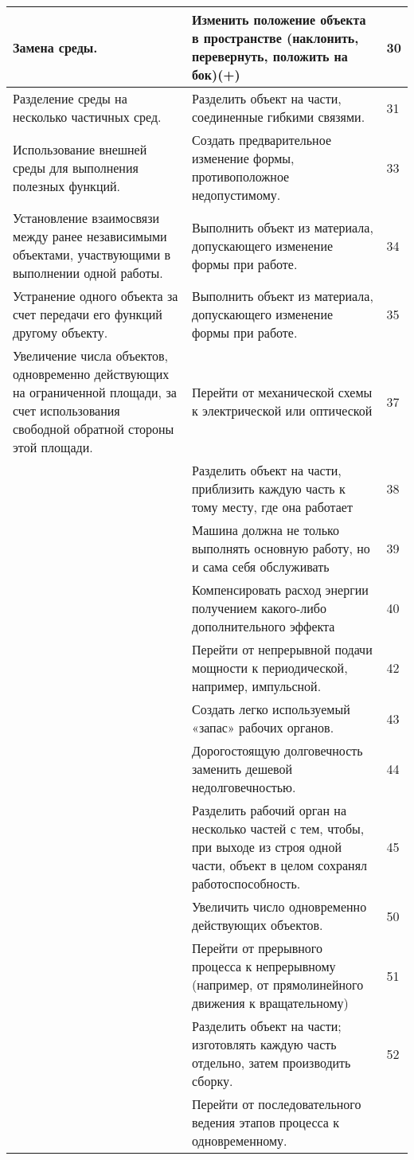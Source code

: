 \documentclass[11pt,a4paper]{article}
\begin{document}
\begin{center}
\begin{tabular}{|p{}|p{}|p{}|}
Замена среды. & Изменить положение объекта в пространстве (наклонить,
перевернуть, положить на бок)(+) & 30\\\hline
Разделение среды на несколько частичных сред. & Разделить объект на части,
соединенные гибкими связями. & 31\\\hline
Использование внешней среды для выполнения полезных функций. & Создать
предварительное изменение формы, противоположное недопустимому. & 33\\\hline
Установление взаимосвязи между ранее независимыми объектами, участвующими в
выполнении одной работы. & Выполнить объект из материала, допускающего
изменение формы при работе. & 34\\\hline
Устранение одного объекта за счет передачи его функций другому объекту. &
Выполнить объект из материала, допускающего изменение формы при работе. &
35\\\hline
Увеличение числа объектов, одновременно действующих на ограниченной площади,
за счет использования свободной обратной стороны этой площади. & Перейти от
механической схемы к электрической или оптической & 37\\\hline
&Разделить объект на части, приблизить каждую часть к тому месту, где она
работает &38\\\hline
&Машина должна не только выполнять основную работу, но и сама себя
обслуживать &39\\\hline
&Компенсировать расход энергии получением какого-либо дополнительного эффекта
&40\\\hline
&Перейти от непрерывной подачи мощности к периодической, например, импульсной.
&42\\\hline
&Создать легко используемый «запас» рабочих органов. & 43\\\hline
&Дорогостоящую долговечность заменить дешевой недолговечностью. & 44\\\hline
&Разделить рабочий орган на несколько частей с тем, чтобы, при выходе из строя
одной части, объект в целом сохранял работоспособность.  & 45\\\hline
&Увеличить число одновременно действующих объектов.  & 50\\\hline
&Перейти от прерывного процесса к непрерывному (например, от прямолинейного
движения к вращательному) & 51\\\hline
&Разделить объект на части; изготовлять каждую часть отдельно, затем
производить сборку. & 52\\\hline
&Перейти от последовательного ведения этапов процесса к одновременному. &

\end{tabular}
\end{center}
\end{document}
